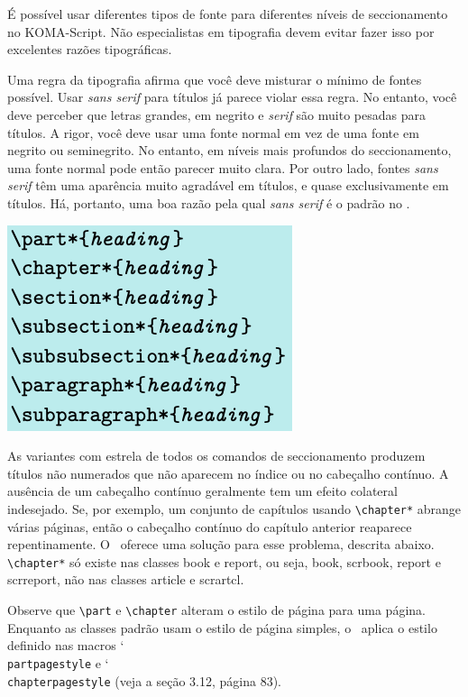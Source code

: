 É possível usar diferentes tipos de fonte para diferentes níveis de seccionamento no KOMA-Script. Não especialistas em tipografia devem evitar fazer isso por excelentes razões tipográficas.

Uma regra da tipografia afirma que você deve misturar o mínimo de fontes possível. Usar \textit{sans serif} para títulos já parece violar essa regra. No entanto, você deve perceber que letras grandes, em negrito e \textit{serif} são muito pesadas para títulos. A rigor, você deve usar uma fonte normal em vez de uma fonte em negrito ou seminegrito. No entanto, em níveis mais profundos do seccionamento, uma fonte normal pode então parecer muito clara. Por outro lado, fontes \textit{sans serif} têm uma aparência muito agradável em títulos, e quase exclusivamente em títulos. Há, portanto, uma boa razão pela qual \textit{sans serif} é o padrão no \KOMAScript.

\includegraphics[width=0.40\linewidth]{imagens/imagem20.png}

As variantes com estrela de todos os comandos de seccionamento produzem títulos não numerados que não aparecem no índice ou no cabeçalho contínuo. A ausência de um cabeçalho contínuo geralmente tem um efeito colateral indesejado. Se, por exemplo, um conjunto de capítulos usando \verb|\chapter*| abrange várias páginas, então o cabeçalho contínuo do capítulo anterior reaparece repentinamente. O \KOMAScript\ oferece uma solução para esse problema, descrita abaixo. \verb|\chapter*| só existe nas classes book e report, ou seja, book, scrbook, report e scrreport, não nas classes article e scrartcl.

Observe que \verb|\part| e \verb|\chapter| alteram o estilo de página para uma página. Enquanto as classes padrão usam o estilo de página simples, o \KOMAScript\ aplica o estilo definido nas macros \char`\\\texttt{part\-pa\-ge\-sty\-le} e \char`\\\texttt{chap\-ter\-pa\-ge\-sty\-le} (veja a seção 3.12, página 83).

